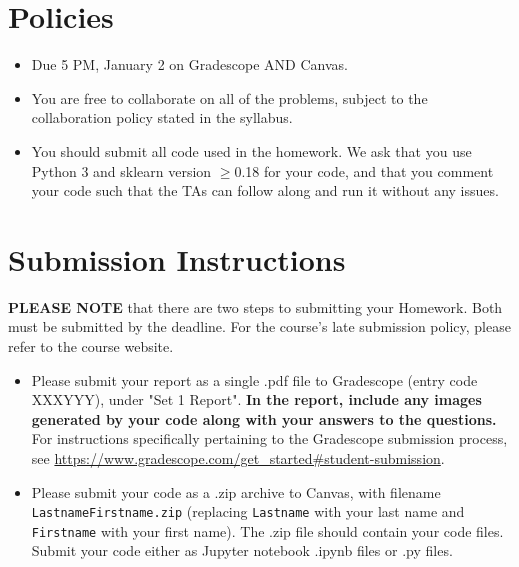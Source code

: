 \newif\ifshowsolutions
\showsolutionsfalse





\pagestyle{fancy}




\section*{Policies}
\begin{itemize}
	\item Due 5 PM, January 2 on Gradescope AND Canvas.
	\item You are free to collaborate on all of the problems, subject to the collaboration policy stated in the syllabus.
	\item You should submit all code used in the homework. We ask that you use Python 3 and sklearn version $\geq$0.18 for your code, and that you comment your code such that the TAs can follow along and run it without any issues.
\end{itemize}

\section*{Submission Instructions}
\textbf{PLEASE NOTE} that there are two steps to submitting your Homework.
Both must be submitted by the deadline. For the course's late submission policy, please refer to the course website.

\begin{itemize}
	\item Please submit your report as a single .pdf file to Gradescope (entry code XXXYYY), under "Set 1 Report". \textbf{In the report, include any images generated by your code along with your answers to the questions.}
	      For instructions specifically pertaining to the Gradescope submission process, see \url{https://www.gradescope.com/get_started#student-submission}.
	\item Please submit your code as a .zip archive to Canvas, with filename \texttt{LastnameFirstname.zip} (replacing \texttt{Lastname} with your last name and \texttt{Firstname} with your first name).
	      The .zip file should contain your code files. Submit your code either as Jupyter notebook .ipynb files or .py files.
\end{itemize}

